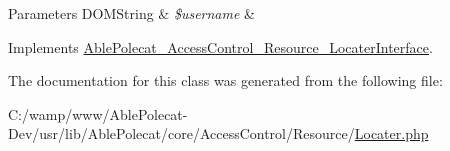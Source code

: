 \begin{DoxyParams}[1]{Parameters}
D\+O\+M\+String & {\em \$username} & \\
\hline
\end{DoxyParams}


Implements \hyperlink{interface_able_polecat___access_control___resource___locater_interface_ac359b701a2ccaff746dd480f03314244}{Able\+Polecat\+\_\+\+Access\+Control\+\_\+\+Resource\+\_\+\+Locater\+Interface}.



The documentation for this class was generated from the following file\+:\begin{DoxyCompactItemize}
\item 
C\+:/wamp/www/\+Able\+Polecat-\/\+Dev/usr/lib/\+Able\+Polecat/core/\+Access\+Control/\+Resource/\hyperlink{_locater_8php}{Locater.\+php}\end{DoxyCompactItemize}
